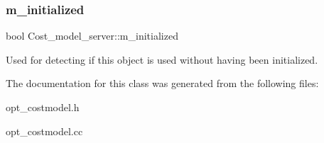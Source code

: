 \subsubsection{\texorpdfstring{m\+\_\+initialized}{m\_initialized}}
{\footnotesize\ttfamily bool Cost\+\_\+model\+\_\+server\+::m\+\_\+initialized\hspace{0.3cm}{\ttfamily [protected]}}

Used for detecting if this object is used without having been initialized. 

The documentation for this class was generated from the following files\+:\begin{DoxyCompactItemize}
\item 
opt\+\_\+costmodel.\+h\item 
opt\+\_\+costmodel.\+cc\end{DoxyCompactItemize}
